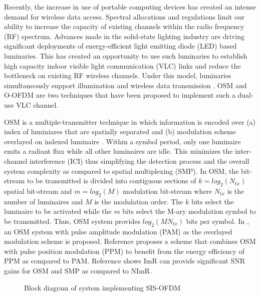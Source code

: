 \documentclass[12pt,letterpaper,onecolumn]{article} %
\begin{document}
\maketitle %
Recently, the increase in use of portable computing devices has created an intense demand for wireless data access. Spectral allocations and regulations limit our ability to increase the capacity of existing channels within the radio frequency (RF) spectrum. Advances made in the solid-state lighting industry are driving significant deployments of energy-efficient light emitting diode (LED) based luminaries. This has created an opportunity to use such luminaries to establish high capacity indoor visible light communication (VLC) links and reduce the bottleneck on existing RF wireless channels. Under this model, luminaries simultaneously support illumination and wireless data transmission \cite{elg11a}. OSM and O-OFDM are two techniques that have been proposed to implement such a dual-use VLC channel.

OSM is a multiple-transmitter technique in which information is encoded over (a) index of luminiares that are spatially separated and (b) modulation scheme overlayed on indexed luminaire \cite{mes10a}. Within a symbol period, only one luminaire emits a radiant flux while all other luminaires are idle. This minimizes the inter-channel interference (ICI) thus simplifying the detection process and the overall system complexity as compared to spatial multiplexing (SMP). In OSM, the bit-stream to be transmitted is divided into contiguous sections of $k=log_2(N_{tx})$ spatial bit-stream and $m=log_2(M)$ modulation bit-stream where $N_{tx}$ is the number of luminaires and $M$ is the modulation order. The $k$ bits select the luminaire to be activated while the $m$ bits select the M-ary modulation symbol to be transmitted. Thus, OSM system provides $log_2(MN_{tx})$ bits per symbol. In \cite{fat11a}, an OSM system with pulse amplitude modulation (PAM) as the overlayed modulation scheme is proposed. Reference \cite{pop12a} proposes a scheme that combines OSM with pulse position modulation (PPM) to benefit from the energy efficiency of PPM as compared to PAM. Reference \cite{but14a} shows ImR can provide significant SNR gains for OSM and SMP as compared to NImR.

\begin{figure}[!t]
\makebox[\textwidth]{\framebox[6.6in]{\rule{0pt}{2.41in}}}
\caption{Block diagram of system implementing SIS-OFDM}
	\label{figBlockDiagram}
\end{figure}
\end{document}
